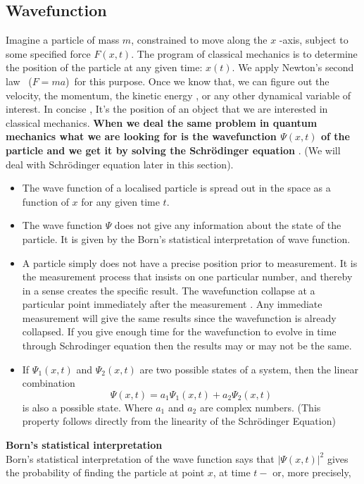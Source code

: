 \subsection{Wavefunction}
Imagine a particle of mass $m$, constrained to move along the $x$ -axis, subject to some specified force $F(x, t)$.  The program of classical mechanics is to determine the position of the particle at any given time: $x(t) .$ We apply Newton's second law \ ($F=ma$)\ for this purpose.  Once we know that, we can figure out the velocity, the momentum, the kinetic energy , or any other dynamical variable of interest. In concise , It's the position of an object that we are interested in classical mechanics. \textbf{When we deal the same  problem in quantum mechanics what we are looking for is the wavefunction  $\Psi(x,t) $ of the particle and we get it by solving the Schrödinger equation	}. (We will deal with Schrödinger equation later in this section).
\begin{itemize}
	
	\item The wave function of a localised particle is spread out in the space as a function of $x$ for any given time $t$.
	\item The wave function  $\Psi$ does not give any information about the state of the particle. It is given by the Born's statistical interpretation of wave function.
	
	\item A particle simply does not have a precise position prior to measurement. It is the measurement process that insists on one particular number, and thereby in a sense creates the specific result. The wavefunction collapse at a particular point immediately after the measurement . Any immediate measurement will give the same results since the wavefunction is already collapsed. If you give enough time for the wavefunction to evolve in time through Schrodinger equation then the results may or may not be the same.
	\item If $\Psi_{1}(x,t)$ and $\Psi_{2}(x,t)$ are two possible states of a system, then the linear combination $$\Psi(x,t)=a_1 \Psi_{1}(x,t) +a_2 \Psi_{2}(x,t)$$ is also a possible state. Where $a_1$ and $a_2$ are complex numbers. (This property follows directly from the linearity of the Schrödinger Equation)
\end{itemize}
\textbf{Born's statistical interpretation }\\ Born's statistical interpretation of the wave function  says that $|\Psi(x, t)|^{2}$ gives the probability of finding the particle at point $x$, at time $t-$ or, more precisely,

